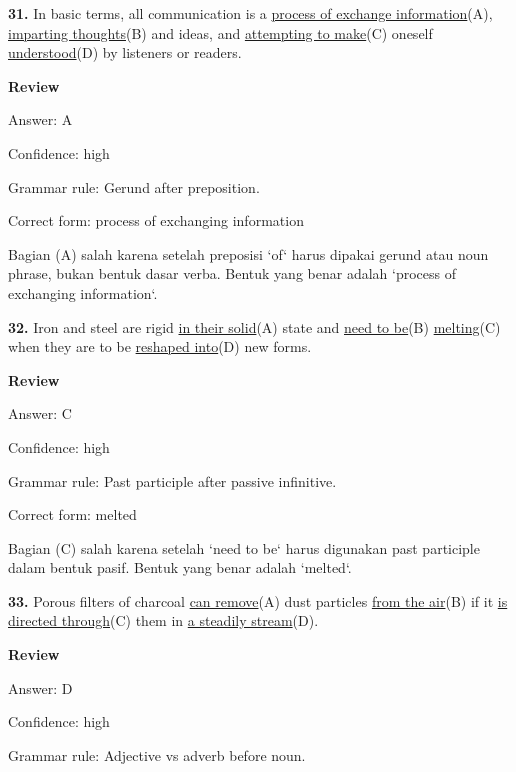 \documentclass[12pt]{article}
\begin{document}
\endgroup
\par
\vspace{\questionblockgap}
\noindent\textbf{31.} In basic terms, all communication is a \uline{process of exchange information}(A), \uline{imparting thoughts}(B) and ideas, and \uline{attempting to make}(C) oneself \uline{understood}(D) by listeners or readers.
\par
\begingroup
\setlength{\parskip}{0pt}
\setlength{\parindent}{0pt}
\textbf{Review}\par
Answer: A\par
Confidence: high\par
Grammar rule: Gerund after preposition.\par
Correct form: process of exchanging information\par
Bagian (A) salah karena setelah preposisi `of` harus dipakai gerund atau noun phrase, bukan bentuk dasar verba. Bentuk yang benar adalah `process of exchanging information`.\par
\endgroup
\par
\vspace{\questionblockgap}
\noindent\textbf{32.} Iron and steel are rigid \uline{in their solid}(A) state and \uline{need to be}(B) \uline{melting}(C) when they are to be \uline{reshaped into}(D) new forms.
\par
\begingroup
\setlength{\parskip}{0pt}
\setlength{\parindent}{0pt}
\textbf{Review}\par
Answer: C\par
Confidence: high\par
Grammar rule: Past participle after passive infinitive.\par
Correct form: melted\par
Bagian (C) salah karena setelah `need to be` harus digunakan past participle dalam bentuk pasif. Bentuk yang benar adalah `melted`.\par
\endgroup
\par
\vspace{\questionblockgap}
\noindent\textbf{33.} Porous filters of charcoal \uline{can remove}(A) dust particles \uline{from the air}(B) if it \uline{is directed through}(C) them in \uline{a steadily stream}(D).
\par
\begingroup
\setlength{\parskip}{0pt}
\setlength{\parindent}{0pt}
\textbf{Review}\par
Answer: D\par
Confidence: high\par
Grammar rule: Adjective vs adverb before noun.\par
\end{document}
